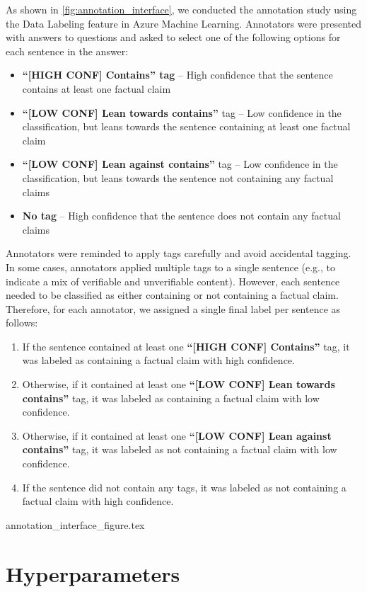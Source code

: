 As shown in \autoref{fig:annotation_interface}, we conducted the annotation study using the Data Labeling feature in Azure Machine Learning. Annotators were presented with answers to questions and asked to select one of the following options for each sentence in the answer:
\begin{itemize}
    \item \textbf{``[HIGH CONF] Contains'' tag} – High confidence that the sentence contains at least one  factual claim
    \item \textbf{``[LOW CONF] Lean towards contains''} tag – Low confidence in the classification, but leans towards the sentence containing at least one  factual claim
    \item \textbf{``[LOW CONF] Lean against contains''} tag – Low confidence in the classification, but leans towards the sentence not containing any  factual claims
    \item \textbf{No tag} – High confidence that the sentence does not contain any factual claims
\end{itemize}

Annotators were reminded to apply tags carefully and avoid accidental tagging. In some cases, annotators applied multiple tags to a single sentence (e.g., to indicate a mix of verifiable and unverifiable content). However, each sentence needed to be classified as either containing or not containing a  factual claim. Therefore, for each annotator, we assigned a single final label per sentence as follows:
\begin{enumerate}
    \item If the sentence contained at least one \textbf{``[HIGH CONF] Contains''} tag, it was labeled as containing a factual claim with high confidence.
    \item Otherwise, if it contained at least one \textbf{``[LOW CONF] Lean towards contains''} tag, it was labeled as containing a factual claim with low confidence.
    \item Otherwise, if it contained at least one \textbf{``[LOW CONF] Lean against contains''} tag, it was labeled as not containing a factual claim with low confidence.
    \item If the sentence did not contain any tags, it was labeled as not containing a factual claim with high confidence.
\end{enumerate}

{annotation_interface_figure.tex}


\section{Hyperparameters}
\label{app:hyperparameters}

